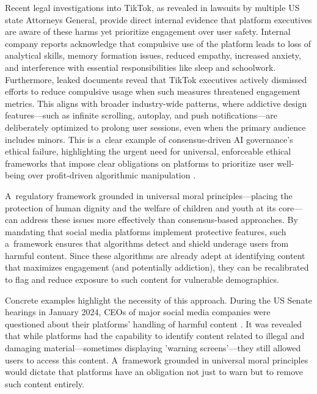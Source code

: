 \documentclass[%
  manuscript=article,
  year=2024,
  volume=77,
  doi=00000.000,
]{zfn}
\begin{document}
Recent legal investigations into TikTok, as revealed in lawsuits by multiple US state Attorneys General, provide direct internal evidence that platform executives are aware of these harms yet prioritize engagement over user safety. Internal company reports acknowledge that compulsive use of the platform leads to loss of analytical skills, memory formation issues, reduced empathy, increased anxiety, and interference with essential responsibilities like sleep and schoolwork. Furthermore, leaked documents reveal that TikTok executives actively dismissed efforts to reduce compulsive usage when such measures threatened engagement metrics. This aligns with broader industry-wide patterns, where addictive design features---such as infinite scrolling, autoplay, and push notifications---are deliberately optimized to prolong user sessions, even when the primary audience includes minors. This is a~clear example of consensus-driven AI governance's ethical failure, highlighting the urgent need for universal, enforceable ethical frameworks that impose clear obligations on platforms to prioritize user well-being over profit-driven algorithmic manipulation 
\parencite[][]{haidt_tiktok_2025}.%




A~regulatory framework grounded in universal moral principles---placing the protection of human dignity and the welfare of children and youth at its core---can address these issues more effectively than consensus-based approaches. By mandating that social media platforms implement protective features, such a~framework ensures that algorithms detect and shield underage users from harmful content. Since these algorithms are already adept at identifying content that maximizes engagement (and potentially addiction), they can be recalibrated to flag and reduce exposure to such content for vulnerable demographics.



Concrete examples highlight the necessity of this approach. During the US Senate hearings in January 2024, CEOs of major social media companies were questioned about their platforms' handling of harmful content 
\parencite[][]{ortutay_meta_2024}. %
 It was revealed that while platforms had the capability to identify content related to illegal and damaging material---sometimes displaying 'warning screens'---they still allowed users to access this content. A~framework grounded in universal moral principles would dictate that platforms have an obligation not just to warn but to remove such content entirely.
\end{document}
